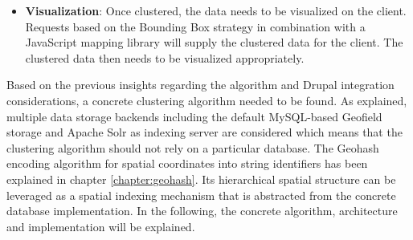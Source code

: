 \begin{itemize}
Two main challenges of integrating a server-side clustering solution with Views have been identified: 1) \textit{allow to inject a custom aggregation implementation}\footnote{\url{http://drupal.org/node/1791796}} and 2) \textit{dealing with geospatially clustered data}\footnote{\url{http://drupal.org/node/1824954}}. The first challenge deals with finding a clean way to integrate a clustering solution into the processing queue of the Views module. The second subsequently deals with challenges that arise when processing and visualizing the clustered data afterwards. As the clustering process changes the data being processed, the implementation needs to take care of involved APIs that work with the changed data. 

Similarly to the previously discussed storage aspect of the Drupal integration, the querying component to account for clustering data in combination with Solr and the Search API.

\item \textbf{Visualization}: Once clustered, the data needs to be visualized on the client. Requests based on the Bounding Box strategy in combination with a JavaScript mapping library will supply the clustered data for the client. The clustered data then needs to be visualized appropriately.

\end{itemize}


Based on the previous insights regarding the algorithm and Drupal integration considerations, a concrete clustering algorithm needed to be found. As explained, multiple data storage backends including the default MySQL-based Geofield storage and Apache Solr as indexing server are considered which means that the clustering algorithm should not rely on a particular database. The Geohash encoding algorithm for spatial coordinates into string identifiers has been explained in chapter \ref{chapter:geohash}. Its hierarchical spatial structure can be leveraged as a spatial indexing mechanism that is abstracted from the concrete database implementation. In the following, the concrete algorithm, architecture and implementation will be explained.









